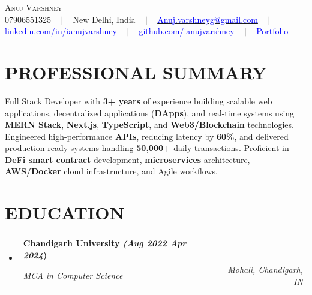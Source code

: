 \documentclass[letterpaper,11pt]{article}
\makeatletter
\newcommand{\resumeSubheading}[4]{
  \vspace{-2pt}\item
    \begin{tabular*}{1.0\textwidth}[t]{l@{\extracolsep{\fill}}r}
      \textbf{\large#1} & \textbf{\small #2} \\
      \textit{\large#3} & \textit{\small #4} \\
      
    \end{tabular*}\vspace{-7pt}
}
\newcommand{\resumeSubHeadingListStart}{\begin{itemize}[leftmargin=0.0in, label={}]}
\newcommand{\resumeSubHeadingListEnd}{\end{itemize}}
\makeatother
\begin{document}



\begin{center}
    {\Huge \scshape Anuj Varshney} \\ \vspace{3pt}
    \small 07906551325 ~ $|$ ~ New Delhi, India ~ $|$ ~
    \href{mailto:Anuj.varshneyg@gmail.com}{\textcolor{blue}{Anuj.varshneyg@gmail.com}} ~ $|$ ~
    \href{https://linkedin.com/in/ianujvarshney}{\textcolor{blue}{linkedin.com/in/ianujvarshney}} ~ $|$ ~
    \href{https://github.com/ianujvarshney}{\textcolor{blue}{github.com/ianujvarshney}} ~ $|$ ~
    \href{https://anuj-varshney.vercel.app/}{\textcolor{blue}{Portfolio}}
\end{center}

\vspace{-8pt}
\section{\textcolor{NavyBlue}{PROFESSIONAL SUMMARY}}
\vspace{2pt}
{\normalsize Full Stack Developer with \textbf{3+ years} of experience building scalable web applications, decentralized applications (\textbf{DApps}), and real-time systems using \textbf{MERN Stack}, \textbf{Next.js}, \textbf{TypeScript}, and \textbf{Web3/Blockchain} technologies. Engineered high-performance \textbf{APIs}, reducing latency by \textbf{60\%}, and delivered production-ready systems handling \textbf{50,000+} daily transactions. Proficient in \textbf{DeFi smart contract} development, \textbf{microservices} architecture, \textbf{AWS/Docker} cloud infrastructure, and Agile workflows.}

\vspace{-6pt}
\section{\textcolor{NavyBlue}{EDUCATION}}

\vspace{2.5pt}
 \resumeSubHeadingListStart
    \resumeSubheading 
      {\hspace{-.2cm}  Chandigarh University   \textbf{{\hfill }\textit{(\textbf{\large Aug 2022 \textendash{} Apr 2024}}}) }{\hspace{-11.3cm} \vspace{2.2pt}} 
      {\hspace{.4cm} \normalsize MCA in Computer Science} {Mohali, Chandigarh, IN} {}{}\vspace{-2.5pt}
  \resumeSubHeadingListEnd
\end{document}
